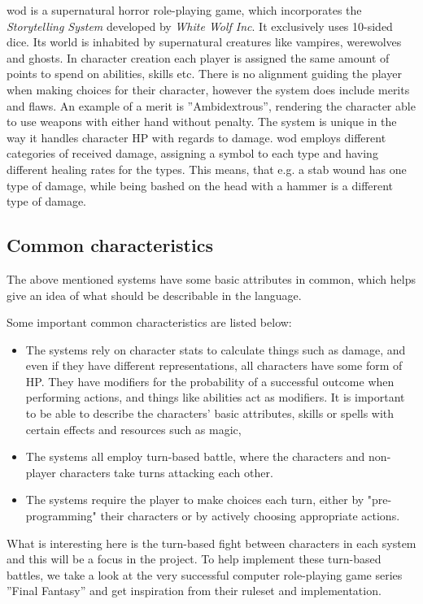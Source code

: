 \ac{wod} is a supernatural horror role-playing game, which incorporates the \emph{Storytelling System} developed by \emph{White Wolf Inc}. It exclusively uses 10-sided dice\cite{Appelcline2007}. Its world is inhabited by supernatural creatures like vampires, werewolves and ghosts. In character creation each player is assigned the same amount of points to spend on abilities, skills etc. There is no alignment guiding the player when making choices for their character, however the system does include merits and flaws. An example of a merit is ''Ambidextrous'', rendering the character able to use weapons with either hand without penalty. The system is unique in the way it handles character HP with regards to damage. \ac{wod} employs different categories of received damage, assigning a symbol to each type and having different healing rates for the types.\cite{wod} This means, that e.g. a stab wound has one type of damage, while being bashed on the head with a hammer is a different type of damage.

\subsection{Common characteristics}
\label{baseclasses}
The above mentioned systems have some basic attributes in common, which helps give an idea of what should be describable in the language.

Some important common characteristics are listed below:
\begin{itemize}
	\item The systems rely on character stats to calculate things such as damage, and even if they have different representations, all characters have some form of HP. They have modifiers for the probability of a successful outcome when performing actions, and things like abilities act as modifiers. It is important to be able to describe the characters' basic attributes, skills or spells with certain effects and resources such as magic, 
	\item The systems all employ turn-based battle, where the characters and non-player characters take turns attacking each other. 
	\item The systems require the player to make choices each turn, either by "pre-programming" their characters or by actively choosing appropriate actions.
\end{itemize}

What is interesting here is the turn-based fight between characters in each system and this will be a focus in the project.
To help implement these turn-based battles, we take a look at the very successful computer role-playing game series ''Final Fantasy'' and get inspiration from their ruleset and implementation.

